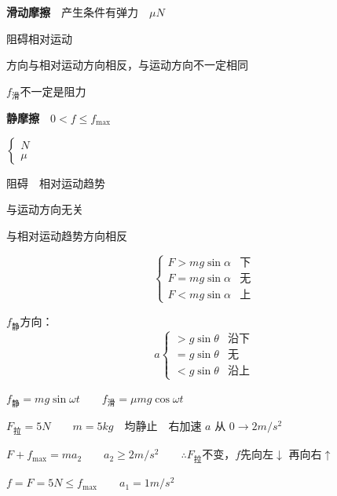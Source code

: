 \textbf{滑动摩擦}　产生条件有弹力　$\mu N$

阻碍相对运动

方向与相对运动方向相反，与运动方向不一定相同

$f_{\text{滑}}$不一定是阻力


\textbf{静摩擦}　$0<f\le f_{\max}$ %

$\left\{\begin{array}{l}N\\ \mu\end{array}\right.$

阻碍　相对运动趋势

与运动方向无关

与相对运动趋势方向相反


\[
\left\{\begin{array}{ll}
F>mg\sin\alpha & \text{下}\\
F=mg\sin\alpha & \text{无}\\
F<mg\sin\alpha & \text{上}
\end{array}\right.
\]

$f_{\text{静}}$方向：
\[
a\left\{\begin{array}{ll}
>g\sin\theta & \text{沿下}\\
=g\sin\theta & \text{无}\\
<g\sin\theta & \text{沿上}
\end{array}\right.
\]

$f_{\text{静}}=mg\sin\omega t$　　$f_{\text{滑}}=\mu mg\cos\omega t$


$F_{\text{拉}}=5\unit{N}$　　$m=5\unit{kg}$　均静止　右加速 $a$ 从 $0\to 2\unit{m/s^2}$ %

$F+f_{\max}=ma_2$　　$a_2\ge 2\unit{m/s^2}$　　$\therefore F_{\text{拉}}$不变，$f$先向左$\downarrow$ 再向右$\uparrow$

$f=F=5\unit{N}\le f_{\max}$　　$a_1=1\unit{m/s^2}$
